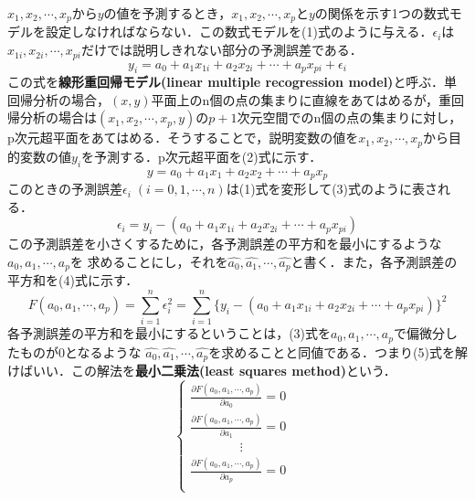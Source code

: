 \documentclass[dvipdfmx]{jsarticle}
\begin{document}
$x_1, x_2, \cdots, x_p$から$y$の値を予測するとき，$x_1, x_2, \cdots, x_p$と$y$の関係を示す1つの数式モデルを設定しなければならない．この数式モデルを(1)式のように与える．$\epsilon_i$は$x_{1i}, x_{2i}, \cdots, x_{pi}$だけでは説明しきれない部分の予測誤差である．
\begin{equation}
  y_i = a_0 + a_1x_{1i}+a_2x_{2i}+\cdots + a_p x_{pi}+\epsilon_i
\end{equation}
この式を\textbf{線形重回帰モデル(linear multiple recogression model)}と呼ぶ．単回帰分析の場合，$(x,y)$平面上のn個の点の集まりに直線をあてはめるが，重回帰分析の場合は$(x_1, x_2, \cdots, x_p, y)$の$p+1$次元空間でのn個の点の集まりに対し，p次元超平面をあてはめる．そうすることで，説明変数の値を$x_1, x_2, \cdots, x_p$から目的変数の値$y_i$を予測する．p次元超平面を(2)式に示す．
\begin{equation}
  y =  a_0 + a_1x_{1}+a_2x_{2}+\cdots + a_p x_{p}
\end{equation}
このときの予測誤差$\epsilon_i\;(i=0, 1,\cdots,n)$は(1)式を変形して(3)式のように表される．
\begin{equation}
  \epsilon_i = y_i - (a_0 + a_1x_{1i}+a_2x_{2i}+\cdots + a_p x_{pi})
\end{equation}
この予測誤差を小さくするために，各予測誤差の平方和を最小にするような$a_0, a_1, \cdots, a_p$を
求めることにし，それを$\hat{a_0},\hat{a_1},\cdots,\hat{a_p}$と書く．また，各予測誤差の平方和を(4)式に示す．
\begin{equation}
  F(a_0,a_1,\cdots,a_p)=\sum_{i=1}^{n}\epsilon_i^2=\sum_{i=1}^{n}\{ y_i - (a_0 + a_1x_{1i}+a_2x_{2i}+\cdots + a_p x_{pi})\}^2
\end{equation}
各予測誤差の平方和を最小にするということは，(3)式を$a_0,a_1,\cdots,a_p$で偏微分したものが0となるような
$\hat{a_0},\hat{a_1},\cdots,\hat{a_p}$を求めることと同値である．つまり(5)式を解けばいい．この解法を\textbf{最小二乗法(least squares method)}という．
\begin{equation}
  \begin{cases}
    \displaystyle
    \frac{\partial F(a_0,a_1,\cdots,a_p)}{\partial a_0} = 0 & \\
    \displaystyle
    \frac{\partial F(a_0,a_1,\cdots,a_p)}{\partial a_1} = 0 & \\
    \displaystyle
    \; \; \; \; \; \; \; \; \; \; \; \; \; \; \vdots          \\
    \displaystyle
    \frac{\partial F(a_0,a_1,\cdots,a_p)}{\partial a_p} = 0 & \\
  \end{cases}
\end{equation}
\end{document}
